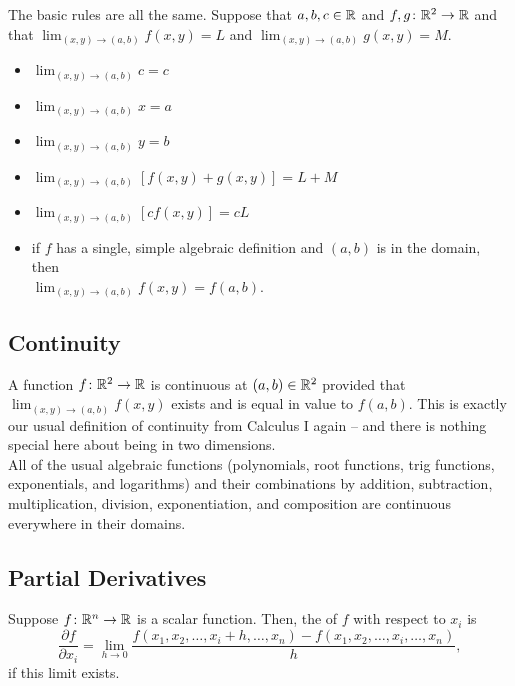 The basic rules are all the same. Suppose that \(a, b, c \in \mathbb{R}\) and \(f, g \colon \mathbb{R}^{2} \to \mathbb{R}\) and that \(\lim_{(x, y) \to (a, b)} f(x, y) = L\) and \(\lim_{(x, y) \to (a, b)} g(x, y) = M\).

\begin{multicols}{2}
    \begin{itemize}
        \item \(\lim_{(x, y) \to (a, b)} c = c\)
        \item \(\lim_{(x, y) \to (a, b)} x = a\)
        \item \(\lim_{(x, y) \to (a, b)} y = b\)
        \item \(\lim_{(x, y) \to (a, b)} [f(x, y) + g(x, y)] = L + M\)
        \item \(\lim_{(x, y) \to (a, b)} [cf(x, y)] = cL\)
    \end{itemize}
\end{multicols}
\vspace*{-0.5cm}
\begin{itemize}
    \item if \(f\) has a single, simple algebraic definition and \((a, b)\) is in the domain, then\\ 
    \(\lim_{(x, y) \to (a, b)} f(x, y) = f(a, b)\).
\end{itemize}

\subsection{Continuity}

A function \(f \colon \mathbb{R}^{2} \to \mathbb{R}\) is continuous at \((a, b) \in \mathbb{R}^{2}\) provided that \(\lim_{(x, y) \to (a, b)} f(x, y)\) exists and is equal in value to \(f(a, b)\). This is exactly our usual definition of continuity from Calculus I again – and there is nothing special here about being in two dimensions. \\

All of the usual algebraic functions (polynomials, root functions, trig functions, exponentials, and logarithms) and their combinations by addition, subtraction, multiplication, division, exponentiation, and composition are continuous everywhere in their domains.

\subsection{Partial Derivatives}

Suppose \(f \colon \mathbb{R}^{n} \to \mathbb{R}\) is a scalar function. Then, the  of \(f\) with respect to \(x_{i}\) is
\[
\dfrac{\partial f}{\partial x_{i}} = \lim_{h \to 0} \dfrac{f(x_{1}, x_{2}, \ldots, x_{i} + h, \ldots, x_{n}) - f(x_{1}, x_{2}, \ldots, x_{i}, \ldots, x_{n})}{h},
\]
if this limit exists. \\

